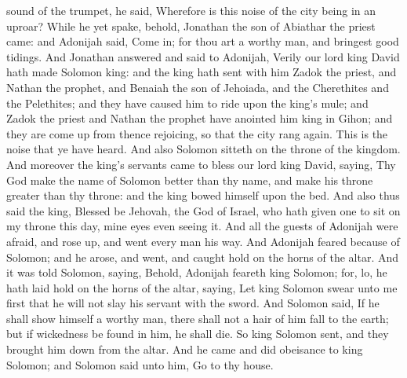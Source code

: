 sound of the trumpet, he said, Wherefore is this noise of the city being in an uproar? While he yet spake, behold, Jonathan the son of Abiathar the priest came: and Adonijah said, Come in; for thou art a worthy man, and bringest good tidings. And Jonathan answered and said to Adonijah, Verily our lord king David hath made Solomon king: and the king hath sent with him Zadok the priest, and Nathan the prophet, and Benaiah the son of Jehoiada, and the Cherethites and the Pelethites; and they have caused him to ride upon the king’s mule; and Zadok the priest and Nathan the prophet have anointed him king in Gihon; and they are come up from thence rejoicing, so that the city rang again. This is the noise that ye have heard. And also Solomon sitteth on the throne of the kingdom. And moreover the king’s servants came to bless our lord king David, saying, Thy God make the name of Solomon better than thy name, and make his throne greater than thy throne: and the king bowed himself upon the bed. And also thus said the king, Blessed be Jehovah, the God of Israel, who hath given one to sit on my throne this day, mine eyes even seeing it.  And all the guests of Adonijah were afraid, and rose up, and went every man his way. And Adonijah feared because of Solomon; and he arose, and went, and caught hold on the horns of the altar. And it was told Solomon, saying, Behold, Adonijah feareth king Solomon; for, lo, he hath laid hold on the horns of the altar, saying, Let king Solomon swear unto me first that he will not slay his servant with the sword. And Solomon said, If he shall show himself a worthy man, there shall not a hair of him fall to the earth; but if wickedness be found in him, he shall die. So king Solomon sent, and they brought him down from the altar. And he came and did obeisance to king Solomon; and Solomon said unto him, Go to thy house. 

